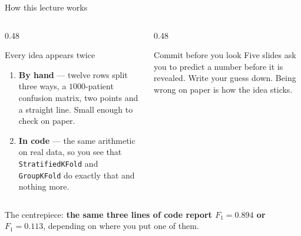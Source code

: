 \documentclass[aspectratio=169]{beamer}
\begin{document}
\begin{frame}[shrink=6]{How this lecture works}
  \begin{columns}[T]
    \begin{column}{0.48\textwidth}
      \begin{block}{Every idea appears twice}
        \begin{enumerate}
          \item \textbf{By hand} --- twelve rows split three ways, a
            $1000$-patient confusion matrix, two points and a straight line.
            Small enough to check on paper.
          \item \textbf{In code} --- the same arithmetic on real data, so you
            see that \texttt{StratifiedKFold} and \texttt{GroupKFold} do
            exactly that and nothing more.
        \end{enumerate}
      \end{block}
    \end{column}
    \begin{column}{0.48\textwidth}
      \begin{alertblock}{Commit before you look}
        Five slides ask you to predict a number before it is revealed. Write
        your guess down. Being wrong on paper is how the idea sticks.
      \end{alertblock}
    \end{column}
  \end{columns}
  \vspace{0.4em}
  \begin{center}
    \small The centrepiece: \textbf{the same three lines of code report
    $F_1 = 0.894$ or $F_1 = 0.113$}, depending on where you put one of
    them.
  \end{center}
\end{frame}
\end{document}
